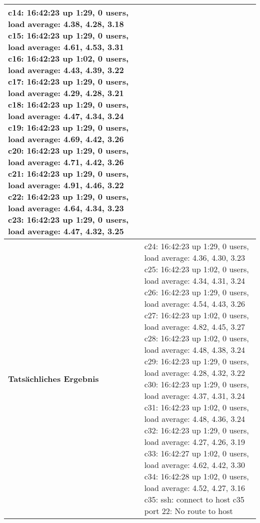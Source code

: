 \begin{longtable}{p{4.5cm}p{11.5cm}}
c14:  16:42:23 up  1:29,  0 users,  load average: 4.38, 4.28, 3.18 \newline
c15:  16:42:23 up  1:29,  0 users,  load average: 4.61, 4.53, 3.31 \newline
c16:  16:42:23 up  1:02,  0 users,  load average: 4.43, 4.39, 3.22 \newline
c17:  16:42:23 up  1:29,  0 users,  load average: 4.29, 4.28, 3.21 \newline
c18:  16:42:23 up  1:29,  0 users,  load average: 4.47, 4.34, 3.24 \newline
c19:  16:42:23 up  1:29,  0 users,  load average: 4.69, 4.42, 3.26 \newline
c20:  16:42:23 up  1:29,  0 users,  load average: 4.71, 4.42, 3.26 \newline
c21:  16:42:23 up  1:29,  0 users,  load average: 4.91, 4.46, 3.22 \newline
c22:  16:42:23 up  1:29,  0 users,  load average: 4.64, 4.34, 3.23 \newline
c23:  16:42:23 up  1:29,  0 users,  load average: 4.47, 4.32, 3.25 \newline
 \\\hline
\cellcolor{heading}\textbf{Tatsächliches Ergebnis} &
c24:  16:42:23 up  1:29,  0 users,  load average: 4.36, 4.30, 3.23 \newline
c25:  16:42:23 up  1:02,  0 users,  load average: 4.34, 4.31, 3.24 \newline
c26:  16:42:23 up  1:29,  0 users,  load average: 4.54, 4.43, 3.26 \newline
c27:  16:42:23 up  1:02,  0 users,  load average: 4.82, 4.45, 3.27 \newline
c28:  16:42:23 up  1:02,  0 users,  load average: 4.48, 4.38, 3.24 \newline
c29:  16:42:23 up  1:29,  0 users,  load average: 4.28, 4.32, 3.22 \newline
c30:  16:42:23 up  1:29,  0 users,  load average: 4.37, 4.31, 3.24 \newline
c31:  16:42:23 up  1:02,  0 users,  load average: 4.48, 4.36, 3.24 \newline
c32:  16:42:23 up  1:29,  0 users,  load average: 4.27, 4.26, 3.19 \newline
c33:  16:42:27 up  1:02,  0 users,  load average: 4.62, 4.42, 3.30 \newline
c34:  16:42:28 up  1:02,  0 users,  load average: 4.52, 4.27, 3.16 \newline
c35: ssh: connect to host c35 port 22: No route to host \newline

\end{longtable}
